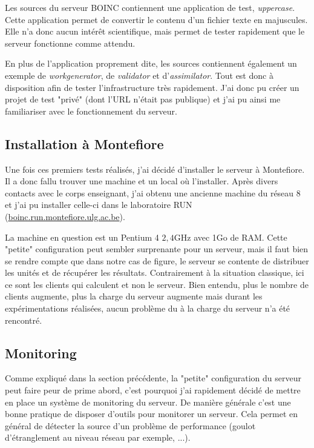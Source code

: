\documentclass[a4paper, 11pt]{report}
\begin{document}
Les sources du serveur \textsc{BOINC} contiennent une application de test, \textit{uppercase}. Cette application permet de convertir le contenu d'un fichier texte en majuscules. Elle n'a donc aucun intérêt scientifique, mais permet de tester rapidement que le serveur fonctionne comme attendu.

En plus de l'application proprement dite, les sources contiennent également un exemple de \textit{workgenerator}, de \textit{validator} et d'\textit{assimilator}. Tout est donc à disposition afin de tester l'infrastructure très rapidement. J'ai donc pu créer un projet de test "privé" (dont l'URL n'était pas publique) et j'ai pu ainsi me familiariser avec le fonctionnement du serveur.


\subsection{Installation à Montefiore}
Une fois ces premiers tests réalisés, j'ai décidé d'installer le serveur à Montefiore. Il a donc fallu trouver une machine et un local où l'installer. Après divers contacts avec le corps enseignant, j'ai obtenu une ancienne machine du réseau 8 et j'ai pu installer celle-ci dans le laboratoire RUN (\url{boinc.run.montefiore.ulg.ac.be}).

La machine en question est un Pentium 4 \@ $2,4$GHz avec 1Go de RAM. Cette "petite" configuration peut sembler surprenante pour un serveur, mais il faut bien se rendre compte que dans notre cas de figure, le serveur se contente de distribuer les unités et de récupérer les résultats. Contrairement à la situation classique, ici ce sont les clients qui calculent et non le serveur. Bien entendu, plus le nombre de clients augmente, plus la charge du serveur augmente mais durant les expérimentations réalisées, aucun problème du à la charge du serveur n'a été rencontré.

\subsection{Monitoring}
Comme expliqué dans la section précédente, la "petite" configuration du serveur peut faire peur de prime abord, c'est pourquoi j'ai rapidement décidé de mettre en place un système de monitoring du serveur. De manière générale c'est une bonne pratique de disposer d'outils pour monitorer un serveur. Cela permet en général de détecter la source d'un problème de performance (goulot d'étranglement au niveau réseau par exemple, ...).
\end{document}
